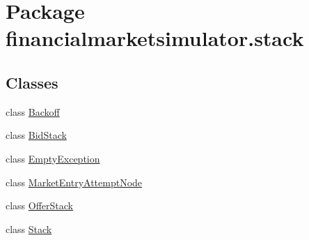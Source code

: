 \hypertarget{namespacefinancialmarketsimulator_1_1stack}{\section{Package financialmarketsimulator.\+stack}
\label{namespacefinancialmarketsimulator_1_1stack}
}
\subsection*{Classes}
\begin{DoxyCompactItemize}
\item 
class \hyperlink{classfinancialmarketsimulator_1_1stack_1_1_backoff}{Backoff}
\item 
class \hyperlink{classfinancialmarketsimulator_1_1stack_1_1_bid_stack}{Bid\+Stack}
\item 
class \hyperlink{classfinancialmarketsimulator_1_1stack_1_1_empty_exception}{Empty\+Exception}
\item 
class \hyperlink{classfinancialmarketsimulator_1_1stack_1_1_market_entry_attempt_node}{Market\+Entry\+Attempt\+Node}
\item 
class \hyperlink{classfinancialmarketsimulator_1_1stack_1_1_offer_stack}{Offer\+Stack}
\item 
class \hyperlink{classfinancialmarketsimulator_1_1stack_1_1_stack}{Stack}
\end{DoxyCompactItemize}
